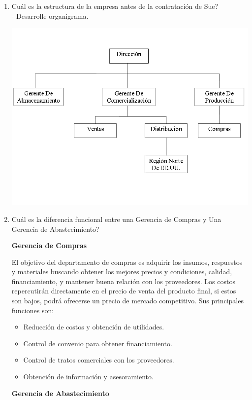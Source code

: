 \documentclass[a4paper,10pt,titlepage]{article}
\begin{document}
\begin{enumerate}
  \item Cu\'al es la estructura de la empresa antes de la contrataci\'on de Sue?\\
  - Desarrolle organigrama.
     \begin{center}
      \includegraphics[scale=0.55]{./orgEmporioAutomotor.png}
     \end{center}
  
  \item Cu\'al es la diferencia funcional entre una Gerencia de Compras y Una Gerencia de Abastecimiento?

\textbf{Gerencia de Compras}

El objetivo del departamento de compras es adquirir los insumos, respuestos y materiales buscando obtener los mejores precios y condiciones, calidad, financiamiento, y mantener buena relaci\'on con los proveedores. Los costos repercutir\'an directamente en el precio de venta del producto final, si estos son bajos, podr\'a ofrecerse un precio de mercado competitivo. Sus principales funciones son: 
\begin{itemize}
\item Reducci\'on de costos y obtenci\'on de utilidades.
\item Control de convenio para obtener financiamiento.
\item Control de tratos comerciales con los proveedores.
\item Obtenci\'on de informaci\'on y asesoramiento.
\end{itemize}

\textbf{Gerencia de Abastecimiento}


\end{enumerate}
\end{document}
